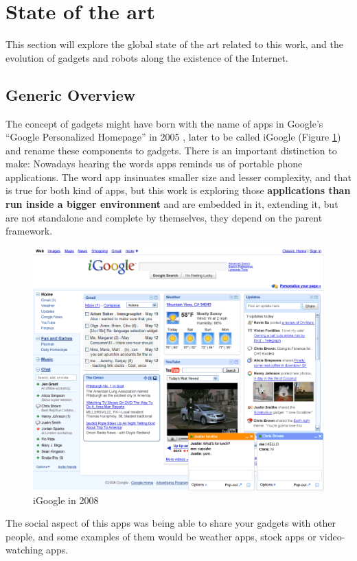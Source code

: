 \newpage
\section{State of the art}
This section will explore the global state of the art related to this work, and the evolution of gadgets and robots along the existence of the Internet.
\subsection{Generic Overview}
The concept of gadgets might have born with the name of apps in Google's ``Google Personalized Homepage'' in 2005 \cite{ref:what_happened_to_igoogle}, later to be called iGoogle (Figure \ref{fig:igoogle_2008}) and rename these components to gadgets. There is an important distinction to make: Nowadays hearing the words apps reminds us of portable phone applications. The word app insinuates smaller size and lesser complexity, and that is true for both kind of apps, but this work is exploring those \textbf{applications than run inside a bigger environment} and are embedded in it, extending it, but are not standalone and complete by themselves, they depend on the parent framework.
\begin{figure}[H]
  \center
    \includegraphics[keepaspectratio, scale=0.6]{Media/Captures/Soa/iGoogle.png}
  \caption{iGoogle in 2008}
  \label{fig:igoogle_2008}
\end{figure}
The social aspect of this apps was being able to share your gadgets with other people, and some examples of them would be weather apps, stock apps or video-watching apps.\\[.2cm]
